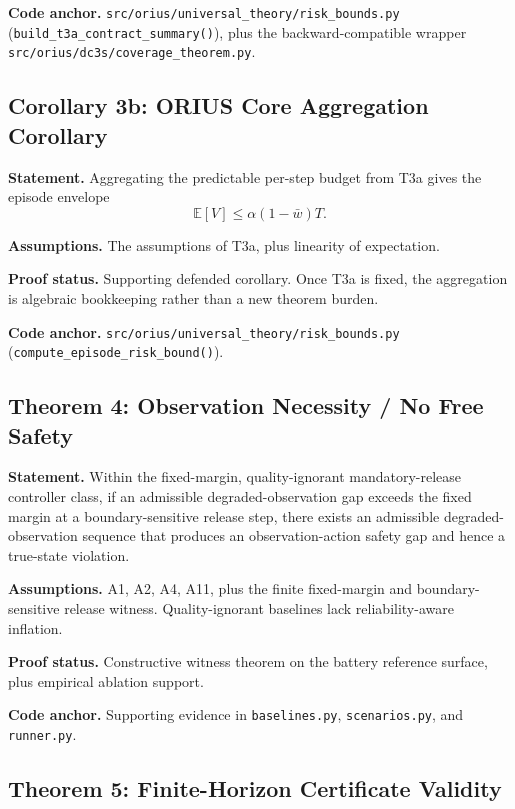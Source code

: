 \textbf{Code anchor.} \texttt{src/orius/universal\_theory/risk\_bounds.py}
(\texttt{build\_t3a\_contract\_summary()}), plus the backward-compatible
wrapper \texttt{src/orius/dc3s/coverage\_theorem.py}.

\subsection{Corollary 3b: ORIUS Core Aggregation Corollary}
\label{sec:thm-core-bound-aggregation}

\textbf{Statement.} Aggregating the predictable per-step budget from T3a gives
the episode envelope
\[
  \mathbb{E}[V] \le \alpha(1-\bar{w})T.
\]

\textbf{Assumptions.} The assumptions of T3a, plus linearity of expectation.

\textbf{Proof status.} Supporting defended corollary.  Once T3a is fixed, the
aggregation is algebraic bookkeeping rather than a new theorem burden.

\textbf{Code anchor.} \texttt{src/orius/universal\_theory/risk\_bounds.py}
(\texttt{compute\_episode\_risk\_bound()}).

\subsection{Theorem 4: Observation Necessity / No Free Safety}
\label{sec:thm-no-free}

\textbf{Statement.} Within the fixed-margin, quality-ignorant
mandatory-release controller class, if an admissible degraded-observation gap
exceeds the fixed margin at a boundary-sensitive release step, there exists an
admissible degraded-observation sequence that produces an observation-action
safety gap and hence a true-state violation.

\textbf{Assumptions.} A1, A2, A4, A11, plus the finite fixed-margin and
boundary-sensitive release witness. Quality-ignorant baselines lack
reliability-aware inflation.

\textbf{Proof status.} Constructive witness theorem on the battery reference
surface, plus empirical ablation support.

\textbf{Code anchor.} Supporting evidence in \texttt{baselines.py},
\texttt{scenarios.py}, and \texttt{runner.py}.

\subsection{Theorem 5: Finite-Horizon Certificate Validity}
\label{sec:thm-cert-horizon}

